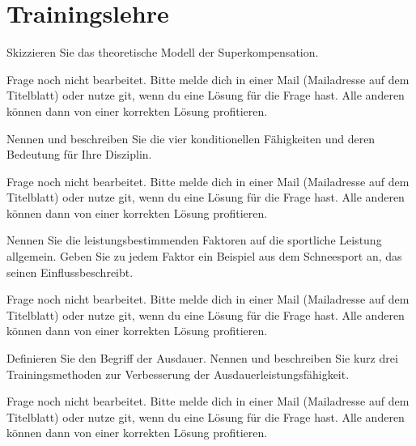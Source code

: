 \section{Trainingslehre}

\begin{question}{3}
    Skizzieren Sie das theoretische Modell der Superkompensation.
\end{question}
\begin{solution}
    Frage noch nicht bearbeitet. Bitte melde dich in einer Mail (Mailadresse auf dem Titelblatt) oder nutze git, wenn du eine Lösung für die Frage hast. Alle anderen können dann von einer korrekten Lösung profitieren.
\end{solution}

\begin{question}{4}
    Nennen und beschreiben Sie die vier konditionellen Fähigkeiten und deren Bedeutung für Ihre Disziplin.
\end{question}
\begin{solution}
    Frage noch nicht bearbeitet. Bitte melde dich in einer Mail (Mailadresse auf dem Titelblatt) oder nutze git, wenn du eine Lösung für die Frage hast. Alle anderen können dann von einer korrekten Lösung profitieren.
\end{solution}

\begin{question}{5}
    Nennen Sie die leistungsbestimmenden Faktoren auf die sportliche Leistung allgemein. Geben Sie zu jedem Faktor ein Beispiel aus dem Schneesport an, das seinen Einflussbeschreibt.
\end{question}
\begin{solution}
    Frage noch nicht bearbeitet. Bitte melde dich in einer Mail (Mailadresse auf dem Titelblatt) oder nutze git, wenn du eine Lösung für die Frage hast. Alle anderen können dann von einer korrekten Lösung profitieren.
\end{solution}

\begin{question}{6}
    Definieren Sie den Begriff der Ausdauer. Nennen und beschreiben Sie kurz drei Trainingsmethoden zur Verbesserung der Ausdauerleistungsfähigkeit.
\end{question}
\begin{solution}
    Frage noch nicht bearbeitet. Bitte melde dich in einer Mail (Mailadresse auf dem Titelblatt) oder nutze git, wenn du eine Lösung für die Frage hast. Alle anderen können dann von einer korrekten Lösung profitieren.
\end{solution}

